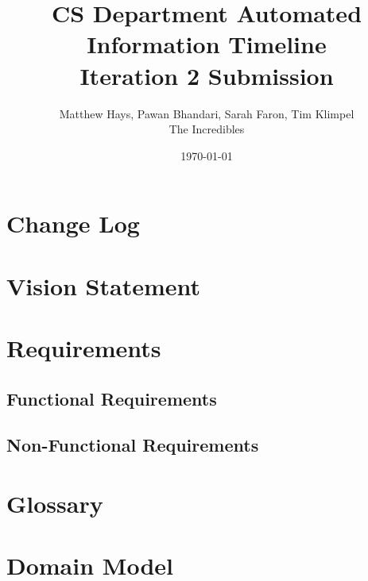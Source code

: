 \documentclass{article}
\title{CS Department Automated Information Timeline \\ Iteration 2 Submission}
\date{\today}
\author{Matthew Hays, Pawan Bhandari, Sarah Faron, Tim Klimpel \\ The Incredibles}
\begin{document}
\maketitle
\newpage
\tableofcontents
\listoffigures
\newpage
\section{Change Log}


\section{Vision Statement}


\section{Requirements}
\subsection{Functional Requirements}


\subsection{Non-Functional Requirements}


\section{Glossary} \label{sec:Glossary}


\section{Domain Model}
\end{document}
